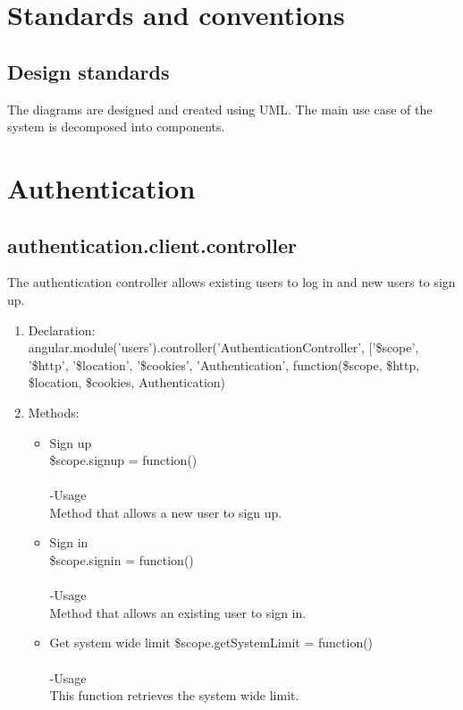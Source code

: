 \documentclass[a4paper,12pt]{report}
\begin{document}
\section{Standards and conventions}

\subsection{Design standards}
 The diagrams are designed and created using UML. The main use case of the system is decomposed into components.
 
\section{Authentication}
\subsection{authentication.client.controller}
The authentication controller allows existing users to log in and new users to sign up.
\begin{enumerate}
\item Declaration: \\angular.module('users').controller('AuthenticationController', ['\$scope', '\$http', '\$location', '\$cookies', 'Authentication',
	function(\$scope, \$http, \$location, \$cookies, Authentication)
\item Methods:
	\begin{itemize}
 	\item Sign up \\
	 \$scope.signup = function()\\  \\
 	-Usage\\
	 Method that allows a new user to sign up.
	 \item Sign in\\
  	\$scope.signin = function()\\ \\
	 -Usage\\
 	Method that allows an existing user to sign in.
 	\item Get system wide limit
 	\$scope.getSystemLimit = function()\\ \\
 	-Usage\\
 	This function retrieves the system wide limit.
 \end{itemize}	
\end{enumerate}
\end{document}
